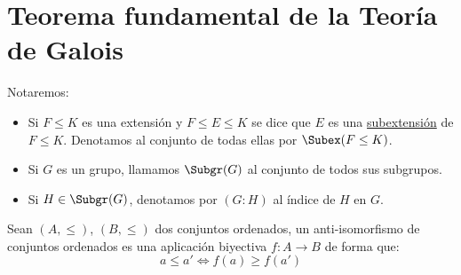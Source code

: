 \section{Teorema fundamental de la Teoría de Galois}

\begin{notacion}
    Notaremos:
    \begin{itemize}
        \item Si $F\leq K$ es una extensión y $F\leq E \leq K$ se dice que $E$ es una \underline{subextensión} de $F\leq K$. Denotamos al conjunto de todas ellas por $\Subex(F\leq K)$.
        \item Si $G$ es un grupo, llamamos $\Subgr(G)$ al conjunto de todos sus subgrupos.
        \item Si $H\in \Subgr(G)$, denotamos por $(G:H)$ al índice de $H$ en $G$.
    \end{itemize}
\end{notacion}

\begin{definicion}
    Sean $(A,\leq)$, $(B,\leq)$ dos conjuntos ordenados, un anti-isomorfismo de conjuntos ordenados es una aplicación biyectiva $f:A\to B$ de forma que:
    \begin{equation*}
        a\leq a' \Longleftrightarrow  f(a)\geq f(a')
    \end{equation*}
\end{definicion}



